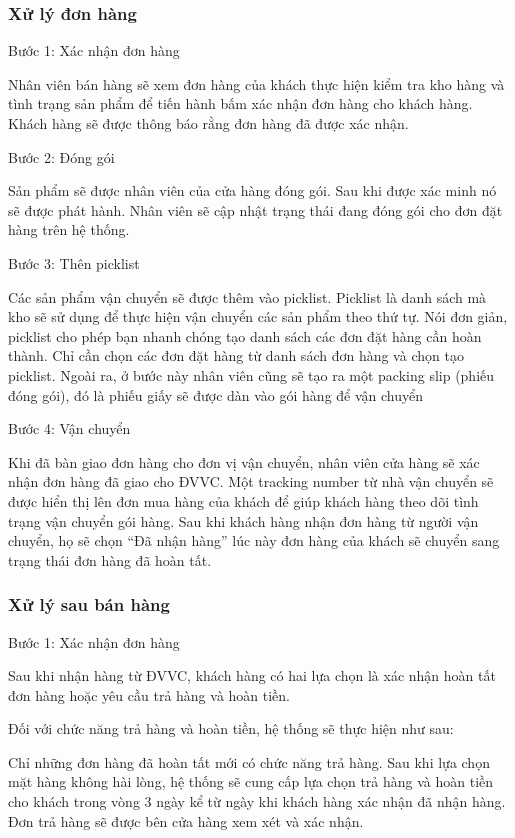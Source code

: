 \documentclass[12pt,a4paper,2sides]{report}
\begin{document}
\subsubsection{Xử lý đơn hàng}

Bước 1: Xác nhận đơn hàng

Nhân viên bán hàng sẽ xem đơn hàng của khách thực hiện kiểm tra kho hàng và tình trạng sản phẩm để tiến hành bấm xác nhận đơn hàng cho khách hàng. Khách hàng sẽ được thông báo rằng đơn hàng đã được xác nhận.

Bước 2: Đóng gói

Sản phẩm sẽ được nhân viên của cửa hàng đóng gói. Sau khi được xác minh nó sẽ được phát hành. Nhân viên sẽ cập nhật trạng thái đang đóng gói cho đơn đặt hàng trên hệ thống.

Bước 3: Thên picklist

Các sản phẩm vận chuyển sẽ được thêm vào picklist. Picklist là danh sách mà kho sẽ sử dụng để thực hiện vận chuyển các sản phẩm theo thứ tự. Nói đơn giản, picklist cho phép bạn nhanh chóng tạo danh sách các đơn đặt hàng cần hoàn thành. Chỉ cần chọn các đơn đặt hàng từ danh sách đơn hàng và chọn tạo picklist. Ngoài ra, ở bước này nhân viên cũng sẽ tạo ra một packing slip (phiếu đóng gói), đó là phiếu giấy sẽ được dàn vào gói hàng để vận chuyển

Bước 4: Vận chuyển

Khi đã bàn giao đơn hàng cho đơn vị vận chuyển, nhân viên cửa hàng sẽ xác nhận đơn hàng đã giao cho ĐVVC. Một tracking number từ nhà vận chuyển sẽ được hiển thị lên đơn mua hàng của khách để giúp khách hàng theo dõi tình trạng vận chuyển gói hàng. Sau khi khách hàng nhận đơn hàng từ người vận chuyển, họ sẽ chọn “Đã nhận hàng” lúc này đơn hàng của khách sẽ chuyển sang trạng thái đơn hàng đã hoàn tất.

\subsubsection{Xử lý sau bán hàng}

Bước 1: Xác nhận đơn hàng

Sau khi nhận hàng từ ĐVVC, khách hàng có hai lựa chọn là xác nhận hoàn tất đơn hàng hoặc yêu cầu trả hàng và hoàn tiền. 

Đối với chức năng trả hàng và hoàn tiền, hệ thống sẽ thực hiện như sau: 

Chỉ những đơn hàng đã hoàn tất mới có chức năng trả hàng. Sau khi lựa chọn mặt hàng không hài lòng, hệ thống sẽ cung cấp lựa chọn trả hàng và hoàn tiền cho khách trong vòng 3 ngày kể từ ngày khi khách hàng xác nhận đã nhận hàng. Đơn trả hàng sẽ được bên cửa hàng xem xét và xác nhận.
\end{document}
